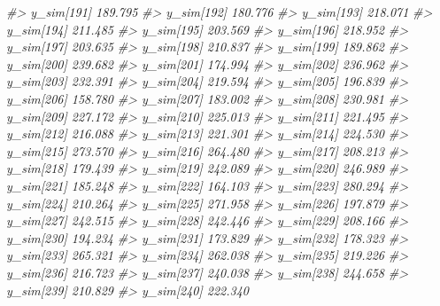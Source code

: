 \documentclass[
  10pt,
  italian,
  a4paper,
  extrafontsizes,onecolumn,openright
  ]{memoir}
\newenvironment{Shaded}{\begin{snugshade}}{\end{snugshade}}
\newcommand{\CommentTok}[1]{\textcolor[rgb]{0.56,0.35,0.01}{\textit{#1}}}
\begin{document}
\begin{Shaded}
\begin{Highlighting}[]
\CommentTok{\#\textgreater{}   y\_sim[191] 189.795}
\CommentTok{\#\textgreater{}   y\_sim[192] 180.776}
\CommentTok{\#\textgreater{}   y\_sim[193] 218.071}
\CommentTok{\#\textgreater{}   y\_sim[194] 211.485}
\CommentTok{\#\textgreater{}   y\_sim[195] 203.569}
\CommentTok{\#\textgreater{}   y\_sim[196] 218.952}
\CommentTok{\#\textgreater{}   y\_sim[197] 203.635}
\CommentTok{\#\textgreater{}   y\_sim[198] 210.837}
\CommentTok{\#\textgreater{}   y\_sim[199] 189.862}
\CommentTok{\#\textgreater{}   y\_sim[200] 239.682}
\CommentTok{\#\textgreater{}   y\_sim[201] 174.994}
\CommentTok{\#\textgreater{}   y\_sim[202] 236.962}
\CommentTok{\#\textgreater{}   y\_sim[203] 232.391}
\CommentTok{\#\textgreater{}   y\_sim[204] 219.594}
\CommentTok{\#\textgreater{}   y\_sim[205] 196.839}
\CommentTok{\#\textgreater{}   y\_sim[206] 158.780}
\CommentTok{\#\textgreater{}   y\_sim[207] 183.002}
\CommentTok{\#\textgreater{}   y\_sim[208] 230.981}
\CommentTok{\#\textgreater{}   y\_sim[209] 227.172}
\CommentTok{\#\textgreater{}   y\_sim[210] 225.013}
\CommentTok{\#\textgreater{}   y\_sim[211] 221.495}
\CommentTok{\#\textgreater{}   y\_sim[212] 216.088}
\CommentTok{\#\textgreater{}   y\_sim[213] 221.301}
\CommentTok{\#\textgreater{}   y\_sim[214] 224.530}
\CommentTok{\#\textgreater{}   y\_sim[215] 273.570}
\CommentTok{\#\textgreater{}   y\_sim[216] 264.480}
\CommentTok{\#\textgreater{}   y\_sim[217] 208.213}
\CommentTok{\#\textgreater{}   y\_sim[218] 179.439}
\CommentTok{\#\textgreater{}   y\_sim[219] 242.089}
\CommentTok{\#\textgreater{}   y\_sim[220] 246.989}
\CommentTok{\#\textgreater{}   y\_sim[221] 185.248}
\CommentTok{\#\textgreater{}   y\_sim[222] 164.103}
\CommentTok{\#\textgreater{}   y\_sim[223] 280.294}
\CommentTok{\#\textgreater{}   y\_sim[224] 210.264}
\CommentTok{\#\textgreater{}   y\_sim[225] 271.958}
\CommentTok{\#\textgreater{}   y\_sim[226] 197.879}
\CommentTok{\#\textgreater{}   y\_sim[227] 242.515}
\CommentTok{\#\textgreater{}   y\_sim[228] 242.446}
\CommentTok{\#\textgreater{}   y\_sim[229] 208.166}
\CommentTok{\#\textgreater{}   y\_sim[230] 194.234}
\CommentTok{\#\textgreater{}   y\_sim[231] 173.829}
\CommentTok{\#\textgreater{}   y\_sim[232] 178.323}
\CommentTok{\#\textgreater{}   y\_sim[233] 265.321}
\CommentTok{\#\textgreater{}   y\_sim[234] 262.038}
\CommentTok{\#\textgreater{}   y\_sim[235] 219.226}
\CommentTok{\#\textgreater{}   y\_sim[236] 216.723}
\CommentTok{\#\textgreater{}   y\_sim[237] 240.038}
\CommentTok{\#\textgreater{}   y\_sim[238] 244.658}
\CommentTok{\#\textgreater{}   y\_sim[239] 210.829}
\CommentTok{\#\textgreater{}   y\_sim[240] 222.340}

\end{Highlighting}
\end{Shaded}
\end{document}
